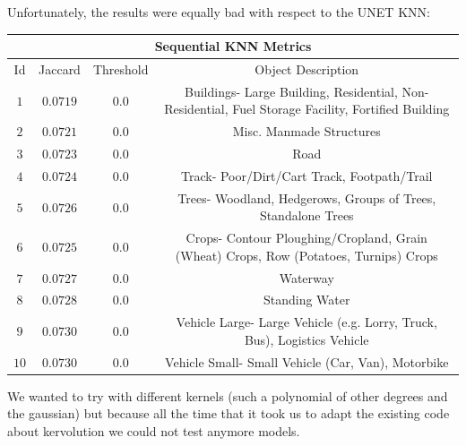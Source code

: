 \documentclass{article}
\begin{document}
Unfortunately, the results were equally bad with respect to the UNET KNN:

\begin{center}
 \begin{tabular}{ |c|c|c|c| } 
 \hline
 \multicolumn{4}{|c|}{Sequential KNN Metrics}\\
 \hline
 \hline
 Id & Jaccard & Threshold & Object Description \\  
 \hline
 \hline
$1$ & $0.0719$ & $0.0$ & \scriptsize Buildings- Large Building, Residential, Non-Residential, Fuel Storage Facility, Fortified Building\\
\hline
$2$ & $0.0721$ & $0.0$ & \scriptsize Misc. Manmade Structures\\
\hline
$3$ & $0.0723$ & $0.0$ & \scriptsize Road\\
\hline
$4$ & $0.0724$ & $0.0$ & \scriptsize Track- Poor/Dirt/Cart Track, Footpath/Trail\\
\hline
$5$ & $0.0726$ & $0.0$ & \scriptsize Trees- Woodland, Hedgerows, Groups of Trees, Standalone Trees\\
\hline
$6$ & $0.0725$ & $0.0$ & \scriptsize Crops- Contour Ploughing/Cropland, Grain (Wheat) Crops, Row (Potatoes, Turnips) Crops\\
\hline
$7$ & $0.0727$ & $0.0$ & \scriptsize Waterway\\
\hline
$8$ & $0.0728$ & $0.0$ & \scriptsize Standing Water\\
\hline
$9$ & $0.0730$ & $0.0$ & \scriptsize Vehicle Large- Large Vehicle (e.g. Lorry, Truck, Bus), Logistics Vehicle\\
\hline
$10$ & $0.0730$ & $0.0$ & \scriptsize Vehicle Small- Small Vehicle (Car, Van), Motorbike\\
\hline
\end{tabular}
\end{center}
We wanted to try with different kernels (such a polynomial of other degrees and the gaussian) but because all the time that it took us to adapt the existing code about kervolution we could not test anymore models.
\end{document}
